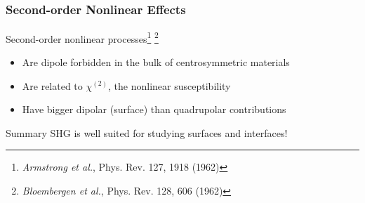 \documentclass{beamer}
\begin{document}
\centering

\subsection{}

\begin{frame}
\frametitle{Second-order Nonlinear Effects}
Second-order nonlinear processes\footnote{\emph{Armstrong et al.}, Phys. Rev.
127, 1918 (1962)}
\footnote{\emph{Bloembergen et al.}, Phys. Rev. 128, 606 (1962)}
\begin{itemize}
\item Are dipole forbidden in the bulk of centrosymmetric materials
\item Are related to $\chi^{(2)}$, the nonlinear susceptibility
\item Have bigger dipolar (surface) than quadrupolar contributions
\end{itemize}\vfill
\begin{block}{Summary}
SHG is well suited for studying surfaces and interfaces!
\end{block}
\end{frame}
\end{document}
